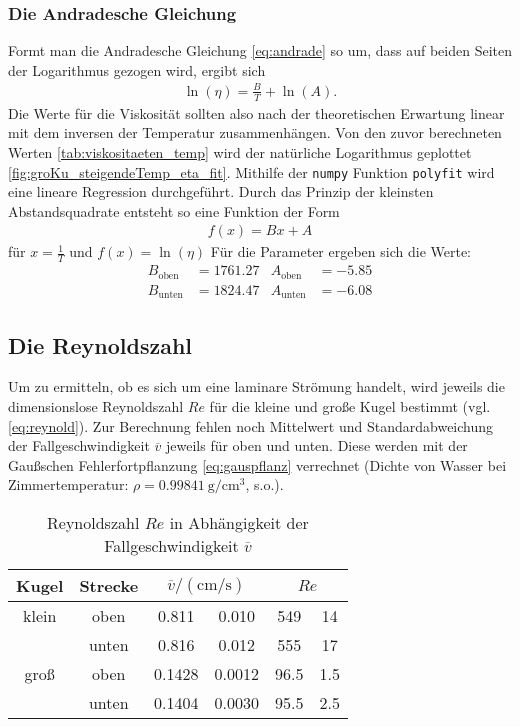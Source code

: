 \subsubsection[]{Die Andradesche Gleichung}
Formt man die Andradesche Gleichung \eqref{eq:andrade} so um, dass auf beiden Seiten der Logarithmus gezogen wird, ergibt sich
\begin{align}
    \ln {\left( \eta \right)} = \frac{B}{T} + \ln{\left( A \right)}.
\end{align}
Die Werte für die Viskosität sollten also nach der theoretischen Erwartung linear mit dem inversen der Temperatur zusammenhängen.
Von den zuvor berechneten Werten \ref{tab:viskositaeten_temp} wird der natürliche Logarithmus geplottet \ref{fig:groKu_steigendeTemp_eta_fit}.
Mithilfe der \texttt{numpy} Funktion \texttt{polyfit} wird eine lineare Regression durchgeführt.
Durch das Prinzip der kleinsten Abstandsquadrate entsteht so eine Funktion der Form
\begin{align*}
    f(x) = B x + A 
\end{align*}
für $x= \frac{1}{T}$ und $f(x)= \ln (\eta)$
Für die Parameter ergeben sich die Werte:
\begin{align*}
    B_\text{oben} &= \num{1761.27} & A_\text{oben} &= \num{-5.85} \\
    B_\text{unten} &= \num{1824.47} & A_\text{unten} &= \num{-6.08}
\end{align*}


\subsection[]{Die Reynoldszahl}
Um zu ermitteln, ob es sich um eine laminare Strömung handelt, wird jeweils die dimensionslose Reynoldszahl $Re$ für die kleine und große Kugel bestimmt
(vgl. \eqref{eq:reynold}).
Zur Berechnung fehlen noch Mittelwert und Standardabweichung der Fallgeschwindigkeit $\overline{v}$ jeweils für oben und unten.
Diese werden mit der Gaußschen Fehlerfortpflanzung \eqref{eq:gauspflanz} verrechnet
(Dichte von Wasser bei Zimmertemperatur: $\rho = \qty{0.99841}{\g \per \cm^3}$, s.o.).

\begin{table}
    \caption[]{Reynoldszahl $Re$ in Abhängigkeit der Fallgeschwindigkeit $\overline{v}$}
    \label{tab:reynold}
    \centering
    \begin{tabular}[]{S S S[table-format=1.4] @{${}\pm{}$} S[table-format=1.4] S[table-format=4.1] @{${}\pm{}$} S[table-format=3.1]}
        \toprule
        {Kugel} & {Strecke} &  &  \\
        \bottomrule
        {klein} & {oben} & 0.811 & 0.010 & 549 & 14 \\
         & {unten} & 0.816 & 0.012 & 555 & 17 \\
        {groß} & {oben} & 0.1428 & 0.0012 & 96.5 & 1.5 \\
         & {unten} & 0.1404 & 0.0030 & 95.5 & 2.5 \\
    \end{tabular}
\end{table}

